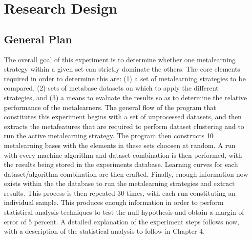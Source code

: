 \chapter{Research Design}
\label{Chapter3}
\section{General Plan}
The overall goal of this experiment is to determine whether one metalearning
strategy within a given set can strictly dominate the others. The core elements
required in order to determine this are: (1) a set of metalearning strategies to be
compared, (2) sets of metabase datasets on which to apply the different strategies,
and (3) a means to evaluate the results so as to determine the relative performance
of the metalearners. The general flow of the program that constitutes this
experiment begins with a set of unprocessed datasets, and then extracts the
metafeatures that are required to perform dataset clustering and to
run the active metalearning strategy. The program then constructs 10
metalearning bases with the elements in these sets choosen at random. A run with
every machine algorithm and dataset combination is then performed, with the
results being stored in the experiments database. Learning curves for each
dataset/algorithm combination are then crafted. Finally, enough information now
exists within the the database to run the metalearning strategies
and extract results. This process is then repeated 30 times, with each run
constituting an individual sample. This produces enough information in order
to perform statistical analysis techniques to test the null hypothesis and
obtain a margin of error of 5 percent. A detailed explanation of the experiment
steps follows now, with a description of the statistical analysis to follow in
Chapter 4.


